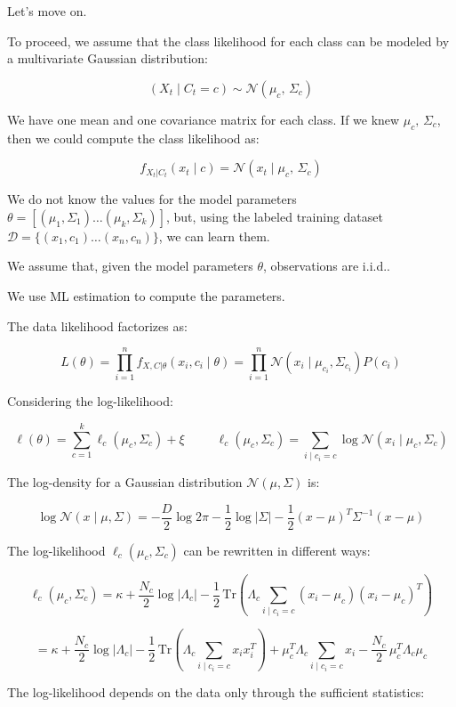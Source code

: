 Let's move on.

To proceed, we assume that the class likelihood for each class can be modeled by a multivariate Gaussian distribution:

$$(X_t \mid C_t = c) \sim \mathcal{N}(\mu_c,\, \Sigma_c)$$

We have one mean and one covariance matrix for each class. If we knew $\mu_c,\, \Sigma_c$, then we could compute the class likelihood as:

$$f_{X_t|C_t}(x_t \mid c) = \mathcal{N}(x_t \mid \mu_c,\, \Sigma_c)$$

We do not know the values for the model parameters $\theta = [(\mu_1, \Sigma_1) \ldots (\mu_k, \Sigma_k)]$, but, using the labeled training dataset $\mathcal{D} = \{(x_1, c_1) \ldots (x_n, c_n)\}$, we can learn them.

We assume that, given the model parameters $\theta$, observations are i.i.d..

We use ML estimation to compute the parameters.

The data likelihood factorizes as:

$$L(\theta) = \prod_{i=1}^{n} f_{X,C|\theta}(x_i, c_i \mid \theta) = \prod_{i=1}^{n} \mathcal{N}\!\left(x_i \mid \mu_{c_i}, \Sigma_{c_i}\right) P(c_i)$$

Considering the log-likelihood:

$$\ell(\theta) = \sum_{c=1}^{k} \ell_c(\mu_c, \Sigma_c) + \xi \,\,\, \qquad \ell_c(\mu_c, \Sigma_c) = \sum_{i \mid c_i = c} \log \mathcal{N}(x_i \mid \mu_c, \Sigma_c)$$

The log-density for a Gaussian distribution $\mathcal{N}(\mu, \Sigma)$ is:

$$\log \mathcal{N}(x \mid \mu, \Sigma) = -\frac{D}{2}\log 2\pi - \frac{1}{2}\log|\Sigma| - \frac{1}{2}(x - \mu)^T \Sigma^{-1}(x - \mu)$$

The log-likelihood $\ell_c(\mu_c, \Sigma_c)$ can be rewritten in different ways:

$$\ell_c(\mu_c, \Sigma_c) = \kappa + \frac{N_c}{2}\log|\Lambda_c| - \frac{1}{2}\,\mathrm{Tr}\!\left(\Lambda_c \sum_{i \mid c_i=c}(x_i - \mu_c)(x_i - \mu_c)^T\right)$$

$$= \kappa + \frac{N_c}{2}\log|\Lambda_c| - \frac{1}{2}\,\mathrm{Tr}\!\left(\Lambda_c \sum_{i \mid c_i=c} x_i x_i^T\right) + \mu_c^T \Lambda_c \sum_{i \mid c_i=c} x_i - \frac{N_c}{2}\,\mu_c^T \Lambda_c \mu_c$$

The log-likelihood depends on the data only through the sufficient statistics:

